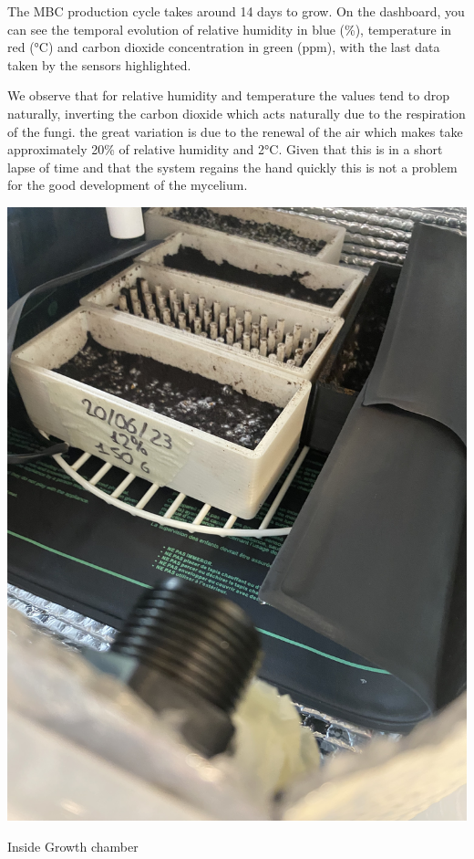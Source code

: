 The MBC production cycle takes around 14 days to grow. On the dashboard, you can see the temporal evolution of relative humidity in blue (\%), temperature in red (°C) and carbon dioxide concentration in green (ppm), with the last data taken by the sensors highlighted.

We observe that for relative humidity and temperature the values tend to drop naturally, inverting the carbon dioxide which acts naturally due to the respiration of the fungi. the great variation is due to the renewal of the air which makes take approximately 20\% of relative humidity and 2°C. Given that this is in a short lapse of time and that the system regains the hand quickly this is not a problem for the good development of the mycelium.



\begin{marginfigure}
    \centering
    \includegraphics{images/IMG_3172.jpg}
    \caption{Inside Growth chamber}
    \label{fig:insidegrowth}
\end{marginfigure}

